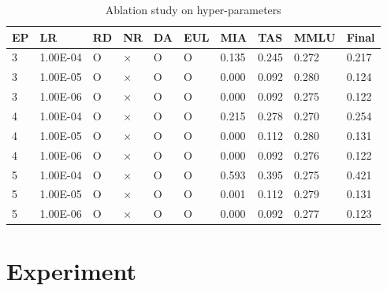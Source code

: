 \documentclass[11pt]{article}
\begin{document}
\begin{table}[t]
  \centering
    \begin{tabular}{|l|l|l|l|l|l|l|l|l|l|}
    \hline
        EP & LR & RD & NR & DA & EUL & MIA & TAS & MMLU & Final \\ \hline
        3 & 1.00E-04 & O & × & O & O & 0.135 & 0.245 & 0.272 & 0.217 \\ \hline
        3 & 1.00E-05 & O & × & O & O & 0.000 & 0.092 & 0.280 & 0.124 \\ \hline
        3 & 1.00E-06 & O & × & O & O & 0.000 & 0.092 & 0.275 & 0.122 \\ \hline
        4 & 1.00E-04 & O & × & O & O & 0.215 & 0.278 & 0.270 & 0.254 \\ \hline
        4 & 1.00E-05 & O & × & O & O & 0.000 & 0.112 & 0.280 & 0.131 \\ \hline
        4 & 1.00E-06 & O & × & O & O & 0.000 & 0.092 & 0.276 & 0.122 \\ \hline
        5 & 1.00E-04 & O & × & O & O & 0.593 & 0.395 & 0.275 & 0.421 \\ \hline
        5 & 1.00E-05 & O & × & O & O & 0.001 & 0.112 & 0.279 & 0.131 \\ \hline
        5 & 1.00E-06 & O & × & O & O & 0.000 & 0.092 & 0.277 & 0.123 \\ \hline
    \end{tabular}
  \caption{
    Ablation study on hyper-parameters }
\label{tab:AS1}
\end{table}



\section{Experiment}


\end{document}
